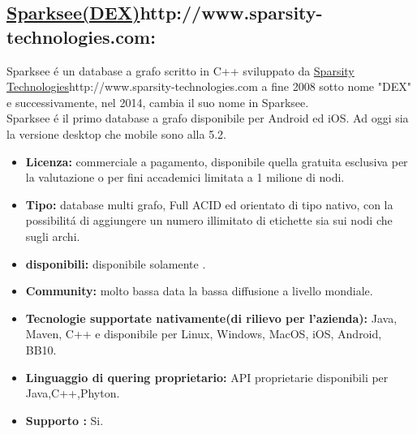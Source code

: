 \subsection{\url{Sparksee(DEX)}{http://www.sparsity-technologies.com}:}
Sparksee \'e un database a grafo   scritto in C++ sviluppato da \url{Sparsity Technologies}{http://www.sparsity-technologies.com} a fine 2008 sotto nome "DEX" e successivamente, nel 2014, cambia il suo nome in Sparksee.\\
Sparksee \'e il primo database a grafo disponibile per Android ed iOS.
Ad oggi sia la versione desktop che mobile sono alla 5.2.
\begin{itemize}
\item \textbf{Licenza:} commerciale a pagamento, disponibile quella gratuita esclusiva per la valutazione o per fini accademici limitata a 1 milione di nodi.
\item \textbf{Tipo:} database multi grafo, Full ACID ed orientato di tipo nativo, con la possibilit\'a di aggiungere un numero illimitato di etichette sia sui nodi che sugli archi.
\item \textbf{ disponibili:} disponibile solamente .
\item \textbf{Community:} molto bassa data la bassa diffusione a livello mondiale.
\item \textbf{Tecnologie supportate nativamente(di rilievo per l'azienda):} Java, Maven, C++ e disponibile per Linux, Windows, MacOS, iOS, Android, BB10.
\item\textbf{Linguaggio di quering proprietario:} API proprietarie disponibili per Java,C++,Phyton.
\item\textbf{Supporto :} Si.


\end{itemize}
